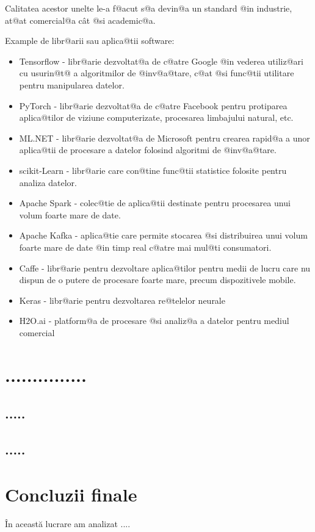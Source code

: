Calitatea acestor unelte le-a f@acut s@a devin@a un standard @in industrie, at@at comercial@a c\^ at @si academic@a.

Example de libr@arii sau aplica@tii software:

\begin{itemize}
	\item Tensorflow - libr@arie dezvoltat@a de c@atre Google @in vederea utiliz@ari cu usurin@t@ a algoritmilor de @inv@a@tare, c@at @si func@tii utilitare pentru manipularea datelor.
	\item PyTorch - libr@arie dezvoltat@a de c@atre Facebook pentru protiparea aplica@tilor de viziune computerizate, procesarea limbajului natural, etc.
	\item ML.NET - libr@arie dezvoltat@a de Microsoft pentru crearea rapid@a a unor aplica@tii de procesare a datelor folosind algoritmi de @inv@a@tare.
	\item scikit-Learn - libr@arie care con@tine func@tii statistice folosite pentru analiza datelor.
	\item Apache Spark - colec@tie de aplica@tii destinate pentru procesarea unui volum foarte mare de date.
	\item Apache Kafka - aplica@tie care permite stocarea @si distribuirea unui volum foarte mare de date @in timp real c@atre mai mul@ti consumatori.
	\item Caffe - libr@arie pentru dezvoltare aplica@tilor pentru medii de lucru care nu dispun de o putere de procesare foarte mare, precum dispozitivele mobile.
	\item Keras - libr@arie pentru dezvoltarea re@telelor neurale
	\item H2O.ai - platform@a de procesare @si analiz@a a datelor pentru mediul comercial
	
\end{itemize}

	

\chapter{...............}

\section{.....}


\section{.....}





\chapter*{Concluzii finale}



\^ In aceast\u a lucrare am analizat ....
